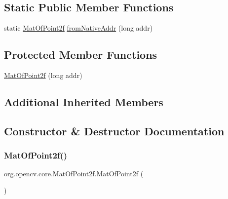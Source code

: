 \subsection*{Static Public Member Functions}
\begin{DoxyCompactItemize}
\item 
static \mbox{\hyperlink{classorg_1_1opencv_1_1core_1_1_mat_of_point2f}{Mat\+Of\+Point2f}} \mbox{\hyperlink{classorg_1_1opencv_1_1core_1_1_mat_of_point2f_aa61b2a0bb3d9fcfff40c6811cc635818}{from\+Native\+Addr}} (long addr)
\end{DoxyCompactItemize}
\subsection*{Protected Member Functions}
\begin{DoxyCompactItemize}
\item 
\mbox{\hyperlink{classorg_1_1opencv_1_1core_1_1_mat_of_point2f_ae07d5f9177d3f9686e860be617a6d5fb}{Mat\+Of\+Point2f}} (long addr)
\end{DoxyCompactItemize}
\subsection*{Additional Inherited Members}


\subsection{Constructor \& Destructor Documentation}
\mbox{\label{classorg_1_1opencv_1_1core_1_1_mat_of_point2f_a77982ba187519a0263b6f0c3ea903f26}} 
\subsubsection{\texorpdfstring{Mat\+Of\+Point2f()}{MatOfPoint2f()}\hspace{0.1cm}{\footnotesize\ttfamily [1/4]}}
{\footnotesize\ttfamily org.\+opencv.\+core.\+Mat\+Of\+Point2f.\+Mat\+Of\+Point2f (\begin{DoxyParamCaption}{ }\end{DoxyParamCaption})}

\mbox{\label{classorg_1_1opencv_1_1core_1_1_mat_of_point2f_ae07d5f9177d3f9686e860be617a6d5fb}} 
